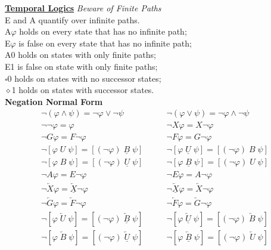 \documentclass{article}
\begin{document}
\begin{multicols}{4}
\textbf{\underline{Temporal Logics}}
\textit{Beware of Finite Paths}\\
E and A quantify over infinite paths.\\
A$\varphi$ holds on every state that has no infinite path;\\
E$\varphi$ is false on every state that has no infinite path;\\
A0 holds on states with only finite paths;\\
E1 is false on state with only finite paths;\\
$\square$0 holds on states with no successor states;\\
$\diamond$1 holds on states with successor states.\\

\textbf{Negation Normal Form}
\begin{align*}
{\neg( \varphi \wedge \psi ) = \neg \varphi \vee \neg \psi} \qquad& {\neg( \varphi \vee \psi ) = \neg \varphi \wedge \neg \psi } \\
{\neg \neg \varphi = \varphi} \qquad & {\neg X \varphi = X \neg \varphi} \\
{\neg G \varphi = F \neg \varphi}\qquad  &{\neg F \varphi = G \neg \varphi}\\
{\neg[\varphi \; U \;\psi] = [ (\neg \varphi) \;\underline{B}\; \psi ]}\qquad  &{\neg[\varphi\; \underline{U}\; \psi] = [ (\neg \varphi)\; B \;\psi ]}\\
{\neg[\varphi \; B \;\psi] = [ (\neg \varphi) \;\underline{U}\; \psi ]}\qquad  &{\neg[\varphi\; \underline{B}\; \psi] = [ (\neg \varphi)\; U\; \psi ]}\\
{\neg A \varphi = E \neg \varphi} \qquad & {\neg E \varphi = A \neg \varphi} \\
{\neg \overleftarrow{X} \varphi = \underline{\overleftarrow{X}} \neg \varphi } \qquad & {\neg \underline{\overleftarrow{X}} \varphi = \overleftarrow{X} \neg \varphi }\\
{\neg \overleftarrow{G} \varphi = \overleftarrow{F} \neg \varphi } \qquad & {\neg \overleftarrow{F} \varphi = \overleftarrow{G} \neg \varphi }\\
{\neg[\varphi \;\overleftarrow{U} \;\psi] = [ (\neg \varphi) \;\overleftarrow{\underline{B}}\; \psi ]}\qquad &{\neg[\varphi\; \overleftarrow{\underline{U}}\; \psi] = [ (\neg \varphi)\; \overleftarrow{B} \; \psi ]}\\
{\neg[\varphi \;\overleftarrow{B} \;\psi] = [ (\neg \varphi) \;\overleftarrow{\underline{U}}\; \psi ]}\qquad &{\neg[\varphi\; \overleftarrow{\underline{B}}\; \psi] = [ (\neg \varphi)\; \overleftarrow{U} \; \psi ]}\\

\end{align*}
\end{multicols}
\end{document}
